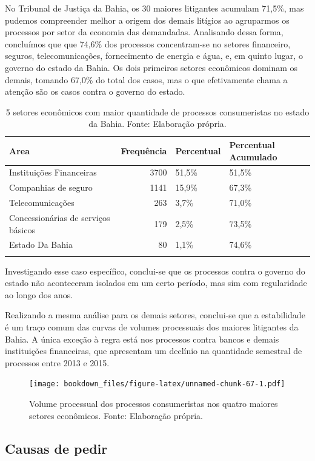 \documentclass[]{report}
\begin{document}
No Tribunal de Justiça da Bahia, os 30 maiores litigantes acumulam
71,5\%, mas pudemos compreender melhor a origem dos demais litígios ao
agruparmos os processos por setor da economia das demandadas. Analisando
dessa forma, concluímos que que 74,6\% dos processos concentram-se no
setores financeiro, seguros, telecomunicações, fornecimento de energia e
água, e, em quinto lugar, o governo do estado da Bahia. Os dois
primeiros setores econômicos dominam os demais, tomando 67,0\% do total
dos casos, mas o que efetivamente chama a atenção são os casos contra o
governo do estado.

\begin{longtable}{lrll}
\caption{5 setores econômicos com maior quantidade de processos consumeristas no estado da Bahia. Fonte: Elaboração própria.} \\
  \hline
Area & Frequência & Percentual & Percentual Acumulado \\
  \hline
Instituições
Financeiras & 3700 & 51,5\% & 51,5\% \\
  Companhias de
seguro & 1141 & 15,9\% & 67,3\% \\
  Telecomunicações & 263 & 3,7\% & 71,0\% \\
  Concessionárias
de serviços
básicos & 179 & 2,5\% & 73,5\% \\
  Estado Da Bahia &  80 & 1,1\% & 74,6\% \\
   \hline
\hline
\label{unnamed-chunk-66}
\end{longtable}

Investigando esse caso específico, conclui-se que os processos contra o
governo do estado não aconteceram isolados em um certo período, mas sim
com regularidade ao longo dos anos.

Realizando a mesma análise para os demais setores, conclui-se que a
estabilidade é um traço comum das curvas de volumes processuais dos
maiores litigantes da Bahia. A única exceção à regra está nos processos
contra bancos e demais instituições financeiras, que apresentam um
declínio na quantidade semestral de processos entre 2013 e 2015.

\begin{figure}[htbp]
\centering
\texttt{[image: bookdown\_files/figure-latex/unnamed-chunk-67-1.pdf]}
\caption{\label{fig:unnamed-chunk-67}Volume processual dos processos
consumeristas nos quatro maiores setores econômicos. Fonte: Elaboração
própria.}
\end{figure}

\subsection{Causas de pedir}\label{causas-de-pedir-5}
\end{document}
